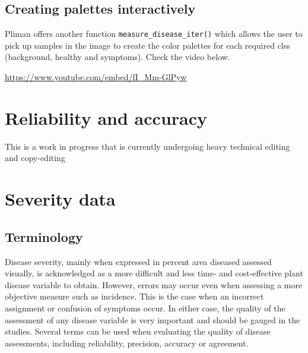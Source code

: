 \documentclass[
  letterpaper,
  DIV=11,
  numbers=noendperiod]{scrreprt}
\begin{document}
\hypertarget{creating-palettes-interactively}{%
\section{Creating palettes
interactively}\label{creating-palettes-interactively}}

Pliman offers another function \texttt{measure\_disease\_iter()} which
allows the user to pick up samples in the image to create the color
palettes for each required clss (background, healthy and symptoms).
Check the video below.

\url{https://www.youtube.com/embed/fI_Mm-GlPyw}

\hypertarget{reliability-and-accuracy}{%
\chapter{Reliability and accuracy}\label{reliability-and-accuracy}}

\begin{tcolorbox}[enhanced jigsaw, breakable, left=2mm, opacityback=0, rightrule=.15mm, toprule=.15mm, colframe=quarto-callout-note-color-frame, arc=.35mm, colback=white, bottomrule=.15mm, leftrule=.75mm]
\begin{minipage}[t]{5.5mm}
\textcolor{quarto-callout-note-color}{\faInfo}
\end{minipage}%
\begin{minipage}[t]{\textwidth - 5.5mm}

This is a work in progress that is currently undergoing heavy technical
editing and copy-editing

\end{minipage}%
\end{tcolorbox}

\hypertarget{severity-data}{%
\chapter{Severity data}\label{severity-data}}

\hypertarget{terminology}{%
\section{Terminology}\label{terminology}}

Disease severity, mainly when expressed in percent area diseased
assessed visually, is acknowledged as a more difficult and less time-
and cost-effective plant disease variable to obtain. However, errors may
occur even when assessing a more objective measure such as incidence.
This is the case when an incorrect assignment or confusion of symptoms
occur. In either case, the quality of the assessment of any disease
variable is very important and should be gauged in the studies. Several
terms can be used when evaluating the quality of disease assessments,
including reliability, precision, accuracy or agreement.
\end{document}
